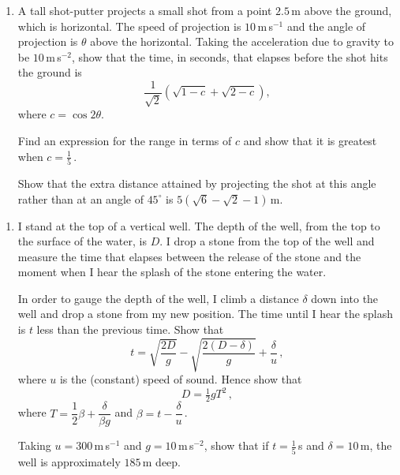 \documentclass[a4, 11pt]{report}
\newlength{\qspace}
\newcounter{qnumber}
\newenvironment{question}%
 {\vspace{\qspace}
  \begin{enumerate}[\bfseries 1\quad][10]%
    \setcounter{enumi}{\value{qnumber}}%
    \item%
 }
{
  \end{enumerate}
  \filbreak
  \stepcounter{qnumber}
 }
\begin{document}
	
\begin{question}
A tall shot-putter
projects a small shot 
from a point $2.5\,$m above the ground, which is horizontal. 
The speed of projection is
$10\,$m\,s$^{- 1}$  and the  angle of projection is $\theta$
 above the horizontal. 
Taking the acceleration due to gravity to be $10\,$m\,s$^{-2}$, 
show that the time, 
in seconds, that elapses before the shot hits the ground is 
\[
\frac1{\sqrt2}\left ( \sqrt{1-c}+ \sqrt{2-c}\right),
\]
where $c = \cos2\theta$.

Find an expression for the range in terms of $c$ and show that
it is greatest when $c= \frac15\,$.

 Show that the extra distance attained 
by projecting the shot at this angle rather than at an angle of $45^\circ$
 is $5(\sqrt6 -\sqrt2 -1)\,$m.
	\end{question}
	
\begin{question}	
I        stand  at the top of a vertical well.
The   
depth of the well, from the top to the surface of the water, is
$D$. I  drop  a stone from 	
the top of the well and 
measure  the time that
 elapses between the release of the stone and the moment when 
I   hear the splash  of the stone entering the water.

In order to gauge the depth of the well,  
I  climb  a distance $\delta$  down into the well 
and drop a stone from my new position. The
time until I hear the splash is $t$ less than the previous time.
Show that
\[
t = \sqrt{\frac{2D}g} -
 \sqrt{\frac{2(D-\delta)}g} + \frac \delta u\,,
\]
where $u$ is the (constant) speed of sound.
Hence show that
\[
D = \tfrac12 gT^2\,,
\]
where $T= \dfrac12 \beta + \dfrac \delta{\beta g}$ 
and $\beta = t - \dfrac \delta u\,$.
	

Taking
$u=300\,$m\,s$^{-1}$ 
and $g=10\,$m\,s$^{-2}$,
show that if $t= \frac 15\,$s and  $\delta=10\,$m, 
 the well is approximately $185\,$m deep.
\end{question}

\end{document}
